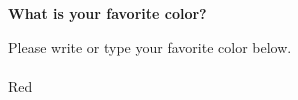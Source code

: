 \item {} {\bf What is your favorite color?}

Please write or type your favorite color below.\\\\
Red
